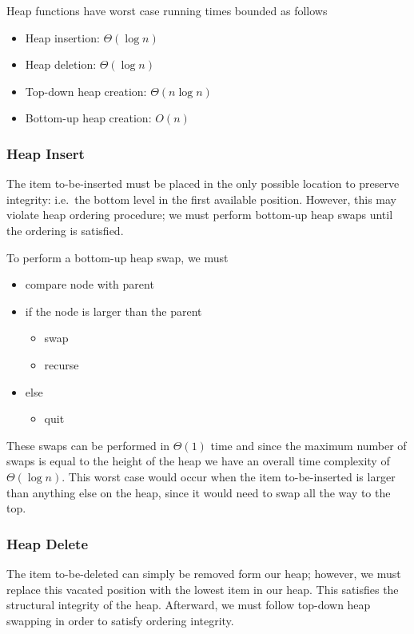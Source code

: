 \documentclass[12pt]{article}
\begin{document}
Heap functions have worst case running times bounded as follows
\begin{itemize}
\item Heap insertion: $\Theta(\log n)$
\item Heap deletion: $\Theta(\log n)$
\item Top-down heap creation: $\Theta(n\log n)$
\item Bottom-up heap creation: $O(n)$
\end{itemize}

\subsubsection{Heap Insert}
The item to-be-inserted must be placed in the only possible location to preserve integrity: i.e.\ the bottom level in the first available position. However, this may violate heap ordering procedure; we must perform bottom-up heap swaps until the ordering is satisfied.

To perform a bottom-up heap swap, we must
\begin{itemize}
\item compare node with parent
\item if the node is larger than the parent
\begin{itemize}
\item swap
\item recurse
\end{itemize}
\item else
\begin{itemize}
\item quit
\end{itemize}
\end{itemize}

These swaps can be performed in $\Theta(1)$ time and since the maximum number of swaps is equal to the height of the heap we have an overall time complexity of $\Theta(\log n)$. This worst case would occur when the item to-be-inserted is larger than anything else on the heap, since it would need to swap all the way to the top.

\subsubsection{Heap Delete}
The item to-be-deleted can simply be removed form our heap; however, we must replace this vacated position with the lowest item in our heap. This satisfies the structural integrity of the heap. Afterward, we must follow top-down heap swapping in order to satisfy ordering integrity.
\end{document}
